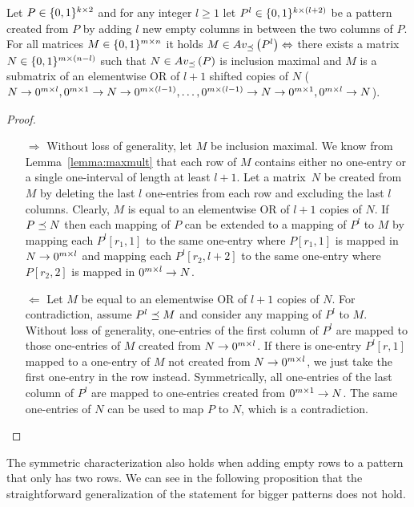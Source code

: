 \begin{thm}
\label{thm:emptymiddle}
Let $P\in\{0,1\}^{k\times2}$ and for any integer $l\geq1$ let $P^l\in\{0,1\}^{k\times(l+2)}$ be a pattern created from $P$ by adding $l$ new empty columns in between the two columns of $P$. For all matrices $M\in\{0,1\}^{m\times n}$ it holds $M\in Av_{\preceq}\left(P^l\right)\Leftrightarrow$ there exists a matrix $N\in\{0,1\}^{m\times(n-l)}$ such that $N\in Av_{\preceq}\left(P\right)$ is inclusion maximal and $M$ is a submatrix of an elementwise OR of $l+1$ shifted copies of $N$ ($N\rightarrow0^{m\times l},0^{m\times 1}\rightarrow N\rightarrow0^{m\times(l-1)},\dots,0^{m\times(l-1)}\rightarrow N\rightarrow0^{m\times1},0^{m\times l}\rightarrow N$).
\end{thm}
\begin{proof}
\begin{itemize}
	\item[$\Rightarrow$] Without loss of generality, let $M$ be inclusion maximal. We know from Lemma~\ref{lemma:maxmult} that each row of $M$ contains either no one-entry or a single one-interval of length at least $l+1$. Let a matrix~$N$ be created from $M$ by deleting the last $l$ one-entries from each row and excluding the last $l$ columns. Clearly, $M$ is equal to an elementwise OR of $l+1$ copies of $N$. If $P\preceq N$ then each mapping of $P$ can be extended to a mapping of $P^l$ to $M$ by mapping each $P^l[r_1,1]$ to the same one-entry where $P[r_1,1]$ is mapped in $N\rightarrow0^{m\times l}$ and mapping each $P^l[r_2,l+2]$ to the same one-entry where $P[r_2,2]$ is mapped in $0^{m\times l}\rightarrow N$.
	\item[$\Leftarrow$] Let $M$ be equal to an elementwise OR of $l+1$ copies of $N$. For contradiction, assume $P^l\preceq M$ and consider any mapping of $P^l$ to $M$. Without loss of generality, one-entries of the first column of $P^l$ are mapped to those one-entries of $M$ created from $N\rightarrow0^{m\times l}$. If there is one-entry $P^l[r,1]$ mapped to a one-entry of $M$ not created from $N\rightarrow0^{m\times l}$, we just take the first one-entry in the row instead. Symmetrically, all one-entries of the last column of $P^l$ are mapped to one-entries created from $0^{m\times1}\rightarrow N$. The same one-entries of $N$ can be used to map $P$ to $N$, which is a contradiction.
\end{itemize}
\end{proof}

The symmetric characterization also holds when adding empty rows to a pattern that only has two rows. We can see in the following proposition that the straightforward generalization of the statement for bigger patterns does not hold.

